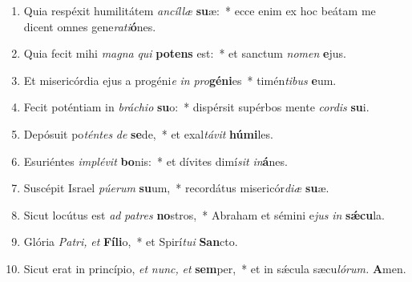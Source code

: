 \documentclass[12pt]{book}
\begin{document}
\begin{enumerate}[label=\arabic*.,%
			leftmargin=0pt, %
			itemindent=0mm, %
			labelsep=3pt, %
			labelwidth=0pt, %
			rightmargin=0pt, %
			parsep=0pt, %
			topsep=0pt, %
			itemsep=0pt,%
			start=3]
\item Quia respéxit humilitátem \textit{ancíllæ} \textbf{su}æ:~* ecce enim ex hoc beátam me dicent omnes gene\textit{rati}\textbf{ó}nes.
\item Quia fecit mihi \textit{magna} \textit{qui} \textbf{pot}\textbf{ens} est:~* et sanctum \textit{nomen} \textbf{e}jus.
\item Et misericórdia ejus a progéni\textit{e} \textit{in} \textit{pro}\textbf{gé}\textbf{ni}es~* timén\textit{tibus} \textbf{e}um.
\item Fecit poténtiam in \textit{bráchio} \textbf{su}o:~* dispérsit supérbos mente \textit{cordis} \textbf{su}i.
\item Depósuit po\textit{téntes} \textit{de} \textbf{se}de,~* et exal\textit{távit} \textbf{húmi}les.
\item Esuriéntes \textit{implévit} \textbf{bo}nis:~* et dívites dimí\hspace{0.04em}\textit{sit} \textit{in}\textbf{á}nes.
\item Suscépit Israel \textit{púerum} \textbf{su}um,~* recordátus misericór\textit{diæ} \textbf{su}æ.
\item Sicut locútus est \textit{ad} \textit{pa}\textit{tres} \textbf{no}stros,~* Abraham et sémini e\hspace{0.02em}\textit{jus} \textit{in} \textbf{sǽcu}la.
\item Glória \textit{Pa}\textit{tri,} \textit{et} \textbf{Fí}\textbf{li}o,~* et Spirí\tinyhspace\textit{tui} \textbf{San}cto.
\item Sicut erat in princípio, \textit{et} \textit{nunc,} \textit{et} \textbf{sem}per,~* et in sǽcula sæcu\tinyhspace\textit{lórum.} \textbf{A}men.
\end{enumerate}


\end{document}
